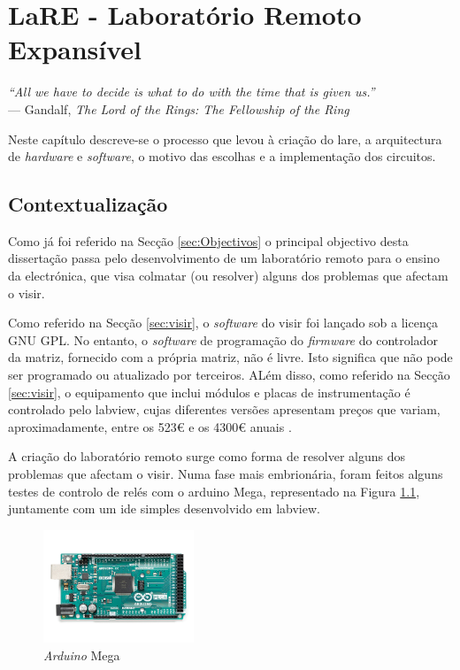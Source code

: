 \chapter{LaRE - Laboratório Remoto Expansível}
\label{Capítulo3}
\begin{flushright}
\textit{``All we have to decide is what to do with the time that is given us.''} \\[0.5em]
--- Gandalf, \textit{The Lord of the Rings: The Fellowship of the Ring}
\end{flushright}

Neste capítulo descreve-se o processo que levou à criação do \acrshort{lare}, a arquitectura de \textit{hardware} e \textit{software}, o motivo das escolhas e a implementação dos circuitos.

\section{Contextualização}
\label{sec:contextualização}
Como já foi referido na Secção \ref{sec:Objectivos} o principal objectivo desta dissertação passa pelo desenvolvimento de um \acrshort{laboratório remoto} para o ensino da electrónica, que visa colmatar (ou resolver) alguns dos problemas que afectam o \acrshort{visir}.

Como referido na Secção \ref{sec:visir}, o \textit{software} do \acrshort{visir} foi lançado sob a licença GNU GPL. 
No entanto, o \textit{software} de programação do \textit{firmware} do controlador da matriz, fornecido com a própria matriz, não é livre. Isto significa que não pode ser programado ou atualizado por terceiros. ALém disso, como referido na Secção \ref{sec:visir}, o equipamento que inclui módulos e placas de instrumentação é controlado pelo \acrshort{labview}, cujas diferentes versões apresentam preços que variam, aproximadamente, entre os 523€ e os 4300€ anuais \cite{labviewpricing}.

A criação do \acrshort{laboratório remoto} surge como forma de resolver alguns dos problemas que afectam o \acrshort{visir}. Numa fase mais embrionária, foram feitos alguns testes de controlo de relés com o \gls{arduino} Mega, representado na Figura \ref{fig:arduinomega}, juntamente com um \acrfull{ide} simples desenvolvido em \acrshort{labview}.

\begin{figure}[hbtp]
    \centering
    \includegraphics[width=0.4\textwidth]{figures/arduinomega.png}
    \caption{\textit{Arduino} Mega \cite{ArduinoMega}}
    \label{fig:arduinomega}
\end{figure}

